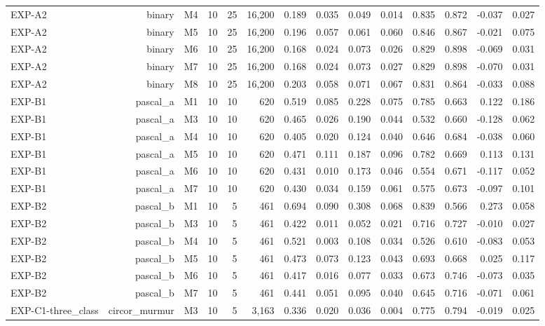 \begin{table}[htbp]
\begin{tabular}{lrrrrrrrrrrrrr}
    EXP-A2 & binary & M4 & 10 & 25 & 16,200 & 0.189 & 0.035 & 0.049 & 0.014 & 0.835 & 0.872 & -0.037 & 0.027 \\
    EXP-A2 & binary & M5 & 10 & 25 & 16,200 & 0.196 & 0.057 & 0.061 & 0.060 & 0.846 & 0.867 & -0.021 & 0.075 \\
    EXP-A2 & binary & M6 & 10 & 25 & 16,200 & 0.168 & 0.024 & 0.073 & 0.026 & 0.829 & 0.898 & -0.069 & 0.031 \\
    EXP-A2 & binary & M7 & 10 & 25 & 16,200 & 0.168 & 0.024 & 0.073 & 0.027 & 0.829 & 0.898 & -0.070 & 0.031 \\
    EXP-A2 & binary & M8 & 10 & 25 & 16,200 & 0.203 & 0.058 & 0.071 & 0.067 & 0.831 & 0.864 & -0.033 & 0.088 \\
    EXP-B1 & pascal\_a & M1 & 10 & 10 & 620 & 0.519 & 0.085 & 0.228 & 0.075 & 0.785 & 0.663 & 0.122 & 0.186 \\
    EXP-B1 & pascal\_a & M3 & 10 & 10 & 620 & 0.465 & 0.026 & 0.190 & 0.044 & 0.532 & 0.660 & -0.128 & 0.062 \\
    EXP-B1 & pascal\_a & M4 & 10 & 10 & 620 & 0.405 & 0.020 & 0.124 & 0.040 & 0.646 & 0.684 & -0.038 & 0.060 \\
    EXP-B1 & pascal\_a & M5 & 10 & 10 & 620 & 0.471 & 0.111 & 0.187 & 0.096 & 0.782 & 0.669 & 0.113 & 0.131 \\
    EXP-B1 & pascal\_a & M6 & 10 & 10 & 620 & 0.431 & 0.010 & 0.173 & 0.046 & 0.554 & 0.671 & -0.117 & 0.052 \\
    EXP-B1 & pascal\_a & M7 & 10 & 10 & 620 & 0.430 & 0.034 & 0.159 & 0.061 & 0.575 & 0.673 & -0.097 & 0.101 \\
    EXP-B2 & pascal\_b & M1 & 10 & 5 & 461 & 0.694 & 0.090 & 0.308 & 0.068 & 0.839 & 0.566 & 0.273 & 0.058 \\
    EXP-B2 & pascal\_b & M3 & 10 & 5 & 461 & 0.422 & 0.011 & 0.052 & 0.021 & 0.716 & 0.727 & -0.010 & 0.027 \\
    EXP-B2 & pascal\_b & M4 & 10 & 5 & 461 & 0.521 & 0.003 & 0.108 & 0.034 & 0.526 & 0.610 & -0.083 & 0.053 \\
    EXP-B2 & pascal\_b & M5 & 10 & 5 & 461 & 0.473 & 0.073 & 0.123 & 0.043 & 0.693 & 0.668 & 0.025 & 0.117 \\
    EXP-B2 & pascal\_b & M6 & 10 & 5 & 461 & 0.417 & 0.016 & 0.077 & 0.033 & 0.673 & 0.746 & -0.073 & 0.035 \\
    EXP-B2 & pascal\_b & M7 & 10 & 5 & 461 & 0.441 & 0.051 & 0.095 & 0.040 & 0.645 & 0.716 & -0.071 & 0.061 \\
    EXP-C1-three\_class & circor\_murmur & M3 & 10 & 5 & 3,163 & 0.336 & 0.020 & 0.036 & 0.004 & 0.775 & 0.794 & -0.019 & 0.025 \\

\end{tabular}
\end{table}
